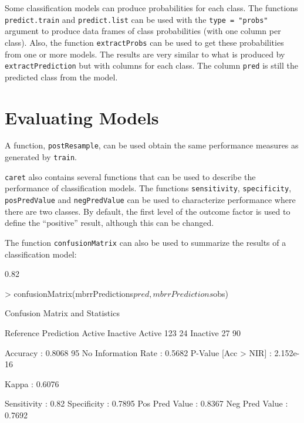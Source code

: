 \documentclass[12pt]{article}
\begin{document}
Some classification models can produce probabilities for each class. The functions \texttt{predict.train} and \texttt{predict.list} can be used with the \texttt{type = "probs"} argument to produce data frames of class probabilities (with one column per class). Also, the function \texttt{extractProbs} can be used to get these probabilities from one or more models. The results are very similar to what is produced by \texttt{extractPrediction} but with columns for each class. The column \texttt{pred} is still the predicted class from the model. 


\section{Evaluating Models}

A function, \texttt{postResample}, can be used obtain the same performance measures as generated by \texttt{train}. 

\texttt{caret} also contains several functions that can be used to describe the performance of classification models. The functions \texttt{sensitivity}, \texttt{specificity}, \texttt{posPredValue} and \texttt{negPredValue} can be used to characterize performance where there are two classes. By default, the first level of the outcome factor is used to define the ``positive'' result, although this can be changed. 

The function \texttt{confusionMatrix} can also be used to summarize the results of a classification model:

\begin{small}
\begin{Schunk}
\begin{Soutput}
[1] 0.82
\end{Soutput}
\begin{Sinput}
> confusionMatrix(mbrrPredictions$pred, mbrrPredictions$obs)
\end{Sinput}
\begin{Soutput}
Confusion Matrix and Statistics

          Reference
Prediction Active Inactive
  Active      123       24
  Inactive     27       90
                                      
            Accuracy : 0.8068         
              95% CI : (0.754, 0.8526)
 No Information Rate : 0.5682         
 P-Value [Acc > NIR] : 2.152e-16      
                                      
               Kappa : 0.6076         
                                      
         Sensitivity : 0.82           
         Specificity : 0.7895         
      Pos Pred Value : 0.8367         
      Neg Pred Value : 0.7692         
\end{Soutput}
\end{Schunk}
\end{small}
\end{document}
